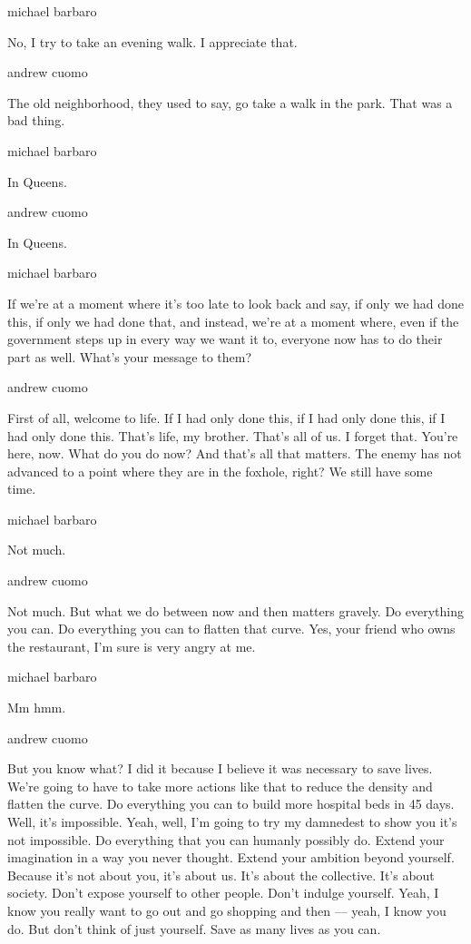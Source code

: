 michael barbaro

No, I try to take an evening walk. I appreciate that.

andrew cuomo

The old neighborhood, they used to say, go take a walk in the park. That
was a bad thing.

michael barbaro

In Queens.

andrew cuomo

In Queens.

michael barbaro

If we're at a moment where it's too late to look back and say, if only
we had done this, if only we had done that, and instead, we're at a
moment where, even if the government steps up in every way we want it
to, everyone now has to do their part as well. What's your message to
them?

andrew cuomo

First of all, welcome to life. If I had only done this, if I had only
done this, if I had only done this. That's life, my brother. That's all
of us. I forget that. You're here, now. What do you do now? And that's
all that matters. The enemy has not advanced to a point where they are
in the foxhole, right? We still have some time.

michael barbaro

Not much.

andrew cuomo

Not much. But what we do between now and then matters gravely. Do
everything you can. Do everything you can to flatten that curve. Yes,
your friend who owns the restaurant, I'm sure is very angry at me.

michael barbaro

Mm hmm.

andrew cuomo

But you know what? I did it because I believe it was necessary to save
lives. We're going to have to take more actions like that to reduce the
density and flatten the curve. Do everything you can to build more
hospital beds in 45 days. Well, it's impossible. Yeah, well, I'm going
to try my damnedest to show you it's not impossible. Do everything that
you can humanly possibly do. Extend your imagination in a way you never
thought. Extend your ambition beyond yourself. Because it's not about
you, it's about us. It's about the collective. It's about society. Don't
expose yourself to other people. Don't indulge yourself. Yeah, I know
you really want to go out and go shopping and then --- yeah, I know you
do. But don't think of just yourself. Save as many lives as you can.

